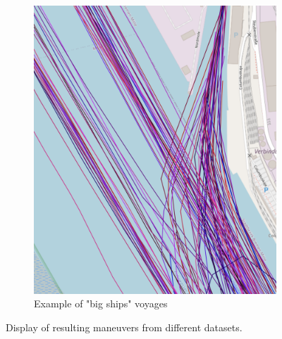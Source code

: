 \begin{figure}[H]
\begin{subfigure}[b]{0.48\textwidth}
            \includegraphics[width=\textwidth]{images/ais/tracks/big_ships_entering.png}
         \caption{Example of "big ships" voyages}
     \end{subfigure}
     \caption{Display of resulting maneuvers from different datasets.}
     \label{fig:cargoAndBig}
\end{figure}


